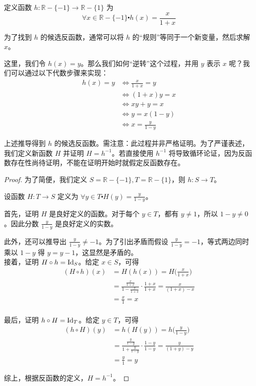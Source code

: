 \begin{example}
    定义函数 $h : \mathbb{R} - \{-1\} \to \mathbb{R}- \{1\}$ 为
    \[\forall x \in \mathbb{R} - \{-1\} \centerdot h(x) = \frac{x}{1+x}\]

    为了找到 $h$ 的候选反函数，通常可以将 $h$ 的``规则''等同于一个新变量，然后求解 $x$。

    这里，我们令 $h(x) = y$。那么我们如何``逆转''这个过程，并用 $y$ 表示 $x$ 呢？我们可以通过以下代数步骤来实现：
    \begin{align*}
        h(x) = y &\iff \frac{x}{1+x} = y \\
        &\iff (1 + x)y = x \\
        &\iff xy + y = x \\
        &\iff y = x(1 - y) \\
        &\iff x = \frac{y}{1-y}
    \end{align*}

    上述推导得到 $h$ 的候选反函数。需注意：此过程并非严格证明。为了严谨表述，我们定义新函数 $H$ 并证明 $H = h^{-1}$。若直接使用 $h^{-1}$ 将导致循环论证，因为反函数存在性尚待证明，不能在证明开始时就假定反函数存在。

    \begin{proof}
        为了简便，我们定义 $S = \mathbb{R} - \{-1\}, T = \mathbb{R}- \{1\}$，则 $h:S \to T$。

        设函数 $H: T \to S$ 定义为 $\forall y \in T \centerdot H(y) = \frac{y}{1-y}$。

        首先，证明 $H$ 是良好定义的函数。对于每个 $y \in T$，都有 $y \ne 1$，所以 $1-y \ne 0$。因此分数 $\frac{y}{1-y}$ 是良好定义的实数。

        此外，还可以推导出 $\frac{y}{1-y} \ne -1$。为了引出矛盾而假设 $\frac{y}{1-y} = -1$，等式两边同时乘以 $1-y$ 得 $y = y-1$，这显然是矛盾的。\\

        接着，证明 $H \circ h = \text{Id}_S$。给定 $x \in S$，可得
        \begin{align*}
            (H \circ h)(x) &= H(h(x)) = H\Big(\frac{x}{1+x}\Big) \\
            &=\frac{\frac{x}{1+x}}{1-\frac{x}{1+x}} \cdot \frac{1+x}{1+x} = \frac{x}{(1+x)-x} \\
            &=\frac{x}{1} = x\\
        \end{align*}

        最后，证明 $h \circ H = \text{Id}_T$。给定 $y \in T$，可得
        \begin{align*}
            (h \circ H)(y) &= h(H(y)) = h\Big(\frac{y}{1-y}\Big) \\
            &=\frac{\frac{y}{1-y}}{1+\frac{y}{1-y}} \cdot \frac{1-y}{1-y} = \frac{y}{(1+y)-y} \\
            &=\frac{y}{1} = y
        \end{align*}

        综上，根据反函数的定义，$H = h^{-1}$。
    \end{proof}
\end{example}

